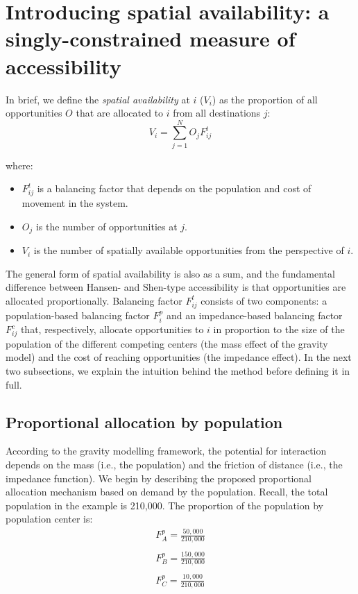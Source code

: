 \documentclass[10pt,letterpaper]{article}
\providecommand{\tightlist}{%
  \setlength{\itemsep}{0pt}\setlength{\parskip}{0pt}}
\begin{document}
\hypertarget{introducing-spatial-availability-a-singly-constrained-measure-of-accessibility}{%
\section{Introducing spatial availability: a singly-constrained measure
of
accessibility}\label{introducing-spatial-availability-a-singly-constrained-measure-of-accessibility}}

In brief, we define the \emph{spatial availability} at \(i\) (\(V_{i}\))
as the proportion of all opportunities \(O\) that are allocated to \(i\)
from all destinations \(j\): \[
V_i = \sum_{j=1}^NO_jF^t_{ij}
\]

\noindent where:

\begin{itemize}
\tightlist
\item
  \(F^t_{ij}\) is a balancing factor that depends on the population and
  cost of movement in the system.
\item
  \(O_j\) is the number of opportunities at \(j\).
\item
  \(V_i\) is the number of spatially available opportunities from the
  perspective of \(i\).
\end{itemize}

The general form of spatial availability is also as a sum, and the
fundamental difference between Hansen- and Shen-type accessibility is
that opportunities are allocated proportionally. Balancing factor
\(F^t_{ij}\) consists of two components: a population-based balancing
factor \(F^p_{i}\) and an impedance-based balancing factor \(F^c_{ij}\)
that, respectively, allocate opportunities to \(i\) in proportion to the
size of the population of the different competing centers (the mass
effect of the gravity model) and the cost of reaching opportunities (the
impedance effect). In the next two subsections, we explain the intuition
behind the method before defining it in full.

\hypertarget{proportional-allocation-by-population}{%
\subsection{Proportional allocation by
population}\label{proportional-allocation-by-population}}

According to the gravity modelling framework, the potential for
interaction depends on the mass (i.e., the population) and the friction
of distance (i.e., the impedance function). We begin by describing the
proposed proportional allocation mechanism based on demand by the
population. Recall, the total population in the example is 210,000. The
proportion of the population by population center is: \[
\begin{array}{l}
F^p_A = \frac{50,000}{210,000}\\
\\
F^p_B = \frac{150,000}{210,000}\\
\\
F^p_C = \frac{10,000}{210,000}\\
\end{array}
\]
\end{document}
